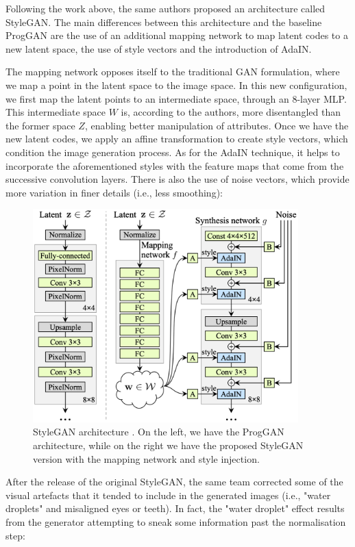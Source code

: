 Following the work above, the same authors proposed an architecture called Style\ac{GAN}. The main differences between this architecture and the baseline Prog\ac{GAN} are the use of an additional mapping network to map latent codes to a new latent space, the use of style vectors and the introduction of \ac{AdaIN}. 

The mapping network opposes itself to the traditional \ac{GAN} formulation, where we map a point in the latent space to the image space. In this new configuration, we first map the latent points to an intermediate space, through an $8$-layer \ac{MLP}. This intermediate space $W$ is, according to the authors, more disentangled than the former space $Z$, enabling better manipulation of attributes. Once we have the new latent codes, we apply an affine transformation to create style vectors, which condition the image generation process. As for the \ac{AdaIN} technique, it helps to incorporate the aforementioned styles  with the feature maps that come from the successive convolution layers. There is also the use of noise vectors, which provide more variation in finer details (i.e., less smoothing):

\begin{figure}[h]
\centering
\includegraphics[width=290pt]{figures/figure_11.pdf}
\caption{Style\ac{GAN} architecture \cite{stylegan}. On the left, we have the Prog\ac{GAN} architecture, while on the right we have the proposed Style\ac{GAN} version with the mapping network and style injection.}
\label{fig:stylegan}
\end{figure}

After the release of the original Style\ac{GAN}, the same team corrected some of the visual artefacts that it tended to include in the generated images (i.e., "water droplets" and misaligned eyes or teeth). In fact, the "water droplet" effect results from the generator attempting to sneak some information past the normalisation step:

